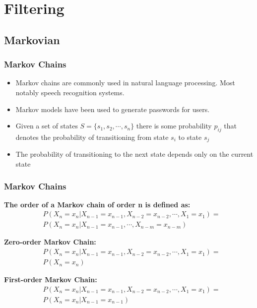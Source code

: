 \documentclass{beamer}
\begin{document}
\section{Filtering} 
\subsection{Markovian}

\begin{frame}
\frametitle{Markov Chains}
\begin{itemize}
\item Markov chains are commonly used in natural language processing. Most notably speech recognition systems.
\item Markov models have been used to generate passwords for users.
\item Given a set of states $S = \lbrace s_1,s_2,\dotsb,s_n \rbrace$ there is some probability $p_{ij}$ that denotes the probability of transitioning from state $s_i$ to state $s_j$
\item The probability of transitioning to the next state depends only on the current state
\end{itemize}
\end{frame}

\begin{frame}
\frametitle{Markov Chains}

\textbf{The order of a Markov chain of order n is defined as:}
\begin{align*}
& P(X_n = x_n | X_{n-1} = x_{n-1}, X_{n-2} = x_{n-2}, \dotsb , X_1 = x_1) = \\ & P(X_n = x_n | X_{n-1} = x_{n-1}, \dotsb , X_{n-m} = x_{n-m})
\end{align*}

\textbf{Zero-order Markov Chain:}
\begin{align*}
& P(X_n = x_n | X_{n-1} = x_{n-1}, X_{n-2} = x_{n-2}, \dotsb , X_1 = x_1) =  \\ & P(X_n = x_n)
\end{align*}

\textbf{First-order Markov Chain:}
\begin{align*}
& P(X_n = x_n | X_{n-1} = x_{n-1}, X_{n-2} = x_{n-2}, \dotsb , X_1 = x_1) = \\ & P(X_n = x_n | X_{n-1} = x_{n-1})
\end{align*}
\end{frame}
\end{document}
